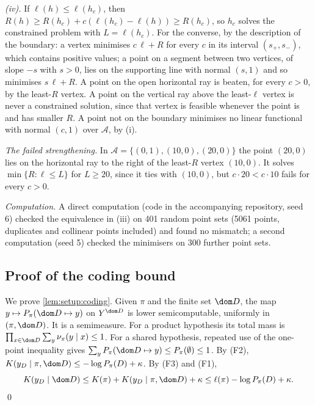\emph{(iv).} If $\ell(h)\le\ell(h_c)$, then $R(h)\ge R(h_c)+c(\ell(h_c)-\ell(h))\ge R(h_c)$, so $h_c$ solves the constrained problem with $L=\ell(h_c)$. For the converse, by the description of the boundary: a vertex minimises $c\,\ell+R$ for every $c$ in its interval $(s_+,s_-)$, which contains positive values; a point on a segment between two vertices, of slope $-s$ with $s>0$, lies on the supporting line with normal $(s,1)$ and so minimises $s\,\ell+R$. A point on the open horizontal ray is beaten, for every $c>0$, by the least-$R$ vertex. A point on the vertical ray above the least-$\ell$ vertex is never a constrained solution, since that vertex is feasible whenever the point is and has smaller $R$. A point not on the boundary minimises no linear functional with normal $(c,1)$ over $\mathcal A$, by (i).

\emph{The failed strengthening.} In $\mathcal A=\{(0,1),(10,0),(20,0)\}$ the point $(20,0)$ lies on the horizontal ray to the right of the least-$R$ vertex $(10,0)$. It solves $\min\{R:\ell\le L\}$ for $L\ge20$, since it ties with $(10,0)$, but $c\cdot20<c\cdot10$ fails for every $c>0$.

\emph{Computation.} A direct computation (code in the accompanying repository, seed 6) checked the equivalence in (iii) on 401 random point sets (5061 points, duplicates and collinear points included) and found no mismatch; a second computation (seed 5) checked the minimisers on 300 further point sets.

\subsection{Proof of the coding bound}\label{app:setup:coding}

We prove \cref{lem:setup:coding}. Given $\pi$ and the finite set $\dom D$, the map $y\mapsto P_\pi(\dom D\mapsto y)$ on $Y^{\dom D}$ is lower semicomputable, uniformly in $(\pi,\dom D)$. It is a semimeasure. For a product hypothesis its total mass is $\prod_{x\in\dom D}\sum_y\nu_\pi(y\mid x)\le1$. For a shared hypothesis, repeated use of the one-point inequality gives $\sum_{y}P_\pi(\dom D\mapsto y)\le P_\pi(\emptyset)\le1$. By (F2), $K(y_D\mid\pi,\dom D)\le-\log P_\pi(D)+\kappa$. By (F3) and (F1),
\[
K(y_D\mid\dom D)\le K(\pi)+K(y_D\mid\pi,\dom D)+\kappa\le\ell(\pi)-\log P_\pi(D)+\kappa.
\]
\qed
